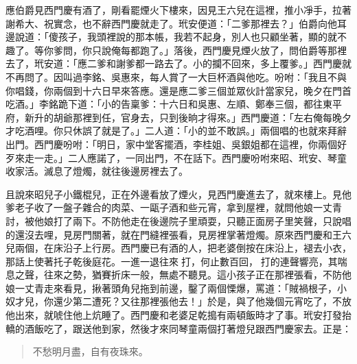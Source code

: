 應伯爵見西門慶有酒了，剛看罷煙火下樓來，因見王六兒在這裡，推小凈手，拉著謝希大、祝實念，也不辭西門慶就走了。玳安便道：「二爹那裡去？」伯爵向他耳邊說道：「傻孩子，我頭裡說的那本帳，我若不起身，別人也只顧坐著，顯的就不趣了。等你爹問，你只說俺每都跑了。」落後，西門慶見煙火放了，問伯爵等那裡去了，玳安道：「應二爹和謝爹都一路去了。小的攔不回來，多上覆爹。」西門慶就不再問了。因叫過李銘、吳惠來，每人賞了一大巨杯酒與他吃。吩咐：「我且不與你唱錢，你兩個到十六日早來答應。還是應二爹三個並眾伙計當家兒，晚夕在門首吃酒。」李銘跪下道：「小的告稟爹：十六日和吳惠、左順、鄭奉三個，都往東平府，新升的胡爺那裡到任，官身去，只到後晌才得來。」西門慶道：「左右俺每晚夕才吃酒哩。你只休誤了就是了。」二人道：「小的並不敢誤。」兩個唱的也就來拜辭出門。西門慶吩咐：「明日，家中堂客擺酒，李桂姐、吳銀姐都在這裡，你兩個好歹來走一走。」二人應諾了，一同出門，不在話下。西門慶吩咐來昭、玳安、琴童收家活。滅息了燈燭，就往後邊房裡去了。

且說來昭兒子小鐵棍兒，正在外邊看放了煙火，見西門慶進去了，就來樓上。見他爹老子收了一盤子雜合的肉菜、一甌子酒和些元宵，拿到屋裡，就問他娘一丈青討，被他娘打了兩下。不防他走在後邊院子里頑耍，只聽正面房子里笑聲，只說唱的還沒去哩，見房門關著，就在門縫裡張看，見房裡掌著燈燭。原來西門慶和王六兒兩個，在床沿子上行房。西門慶已有酒的人，把老婆倒按在床沿上，褪去小衣，那話上使著托子乾後庭花。一進一退往來𢵞打，何止數百回，𢵞打的連聲響亮，其喘息之聲，往來之勢，猶賽折床一般，無處不聽見。這小孩子正在那裡張看，不防他娘一丈青走來看見，揪著頭角兒拖到前邊，鑿了兩個慄爆，罵道：「賊禍根子，小奴才兒，你還少第二遭死？又往那裡張他去！」於是，與了他幾個元宵吃了，不放他出來，就唬住他上炕睡了。西門慶和老婆足乾搗有兩頓飯時才了事。玳安打發抬轎的酒飯吃了，跟送他到家，然後才來同琴童兩個打著燈兒跟西門慶家去。正是：
\begin{quote}
不愁明月盡，自有夜珠來。
\end{quote}
